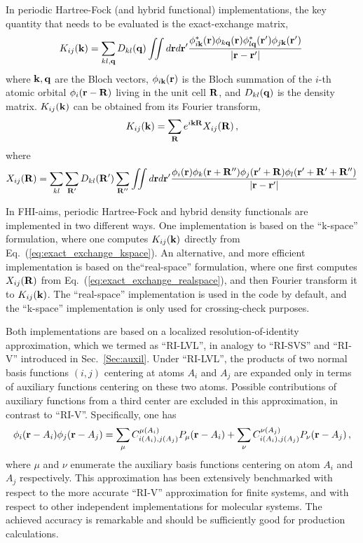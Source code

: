 In periodic Hartree-Fock (and hybrid functional) implementations, the key
quantity that needs to be evaluated is the exact-exchange matrix, 
%
 \begin{equation}
   K_{ij}({\bf k}) = \sum_{kl,{\bf q}} D_{kl}({\bf q}) \iint d{\bf r} d{\bf r'} 
  \frac{\phi_{i{\bf k}}^\ast({\bf r})\phi_{k{\bf q}}({\bf r})\phi_{l{\bf q}}^\ast({\bf r'})\phi_{j{\bf k}}({\bf r'})} 
       {|{\bf r} - {\bf r'}|} \,
  \label{eq:exact_exchange_kspace}
 \end{equation}
%
where ${\bf k},{\bf q}$ are the Bloch vectors,  $\phi_{i{\bf k}}({\bf r})$ is the Bloch
summation of the $i$-th atomic orbital $\phi_i({\bf r} -{\bf R})$ living in the unit cell
${\bf R}$, and $D_{kl}({\bf q})$ is the density matrix. $K_{ij}({\bf k})$ can be obtained
from its Fourier transform,
 \begin{equation}
  K_{ij}({\bf k}) = \sum_{{\bf R}} e^{i{\bf k} {\bf R}} X_{ij}({\bf R})\, ,
 \end{equation}
where 
%
 \begin{equation}
  X_{ij}({\bf R}) =\sum_{kl} \sum_{{\bf R'}} D_{kl}({\bf R'}) \sum_{{\bf R''}} \iint d{\bf r} d{\bf r'}
   \frac{\phi_i({\bf r})\phi_k({\bf r}+{\bf R''})\phi_j({\bf r'}+{\bf R})\phi_l({\bf r'}+{\bf R'}+{\bf R''})}
        {|{\bf r} - {\bf r'}|}
  \label{eq:exact_exchange_realspace}
 \end{equation}
%

In FHI-aims, periodic Hartree-Fock and hybrid density functionals are implemented in two
different ways. One implementation is based on the ``k-space'' formulation, where one 
computes $K_{ij}({\bf k})$ directly from Eq.~(\ref{eq:exact_exchange_kspace}). An 
alternative, and more efficient implementation is based on the``real-space'' formulation, 
where one first computes $X_{ij}({\bf R})$ from Eq.~(\ref{eq:exact_exchange_realspace}), 
and then Fourier transform it to $K_{ij}({\bf k})$.  The ``real-space'' implementation is used 
in the code by default, and the ``k-space'' implementation is only used for crossing-check
purposes.

Both implementations are based on a localized resolution-of-identity approximation,
which we termed as ``RI-LVL'', in analogy to ``RI-SVS'' and ``RI-V'' introduced in
Sec.~\ref{Sec:auxil}. Under ``RI-LVL'', the products of two normal basis functions 
$(i,j)$ centering at atoms $A_i$ and $A_j$ are expanded only in terms of auxiliary 
functions centering on these two atoms. Possible contributions of auxiliary functions 
from a third center are excluded in this approximation, in contrast to ``RI-V''. 
Specifically, one has
  \begin{equation}
    \phi_i({\bf r} - A_i) \phi_j({\bf r} - A_j) =
    \sum_\mu C_{i(A_i),j(A_j)}^{\mu(A_i)} P_\mu({\bf r}-A_i) + 
    \sum_\nu C_{i(A_i),j(A_j)}^{\nu(A_j)} P_\nu({\bf r}-A_j) \, ,
  \end{equation}
where $\mu$ and $\nu$ enumerate the auxiliary basis functions centering 
on atom $A_i$ and $A_j$ respectively. This approximation has been extensively benchmarked
with respect to the more accurate ``RI-V'' approximation for finite systems, and with
respect to other independent implementations for molecular systems. The achieved accuracy 
is remarkable and should be sufficiently good for production calculations.

